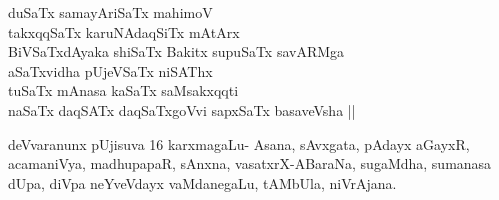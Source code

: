 \begin{entry}
\smallskip
\begin{shl}
duSaTx samayAriSaTx mahimoV\\
takxqqSaTx karuNAdaqSiTx mAtArx\\
BiVSaTxdAyaka shiSaTx Bakitx supuSaTx savARMga\\
aSaTxvidha pUjeVSaTx niSAThx\\
tuSaTx mAnasa kaSaTx saMsakxqqti\\
naSaTx daqSATx daqSaTxgoVvi sapxSaTx basaveVsha ||
\end{shl}
\medskip
{}
\end{entry}

\begin{entry}

\smallskip
\begin{shl}
deVvaranunx pUjisuva 16 karxmagaLu- Asana, sAvxgata, pAdayx aGayxR,
acamaniVya, madhupapaR, sAnxna, vasatxrX-ABaraNa, sugaMdha, sumanasa
dUpa, diVpa neYveVdayx vaMdanegaLu, tAMbUla, niVrAjana. 
\end{shl}
\medskip
{}
\end{entry}

